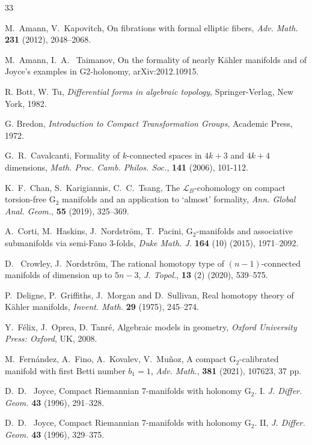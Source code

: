 \documentclass[10pt]{article}
\newcommand{\Gtwo}{\mathrm{G}_2}
\theoremstyle{plain}
\theoremstyle{definition}
\theoremstyle{remark}
\begin{document}
\begin{thebibliography}{33}

M.~Amann, V.~Kapovitch, On fibrations with formal elliptic fibers, \textit{Adv. Math.} \textbf{231} (2012), 2048--2068.

M.~Amann, I.~A.~ Taimanov, On the formality of nearly Kähler manifolds and of Joyce's examples in G2-holonomy,  	arXiv:2012.10915.
 
 R. Bott, W. Tu, {\em Differential forms in algebraic topology}, Springer-Verlag, New York, 1982.

G. Bredon, {\it Introduction to Compact Transformation Groups}, Academic Press, 1972.

G.~R.~Cavalcanti, Formality of $k$-connected spaces in $4k+ 3$ and $4k+ 4$ dimensions, {\em Math. Proc. Camb. Philos. Soc.}, {\bf 141} (2006), 101-112.

K.~F.~Chan, S.~Karigiannis, C.~C.~Tsang, The $\mathcal{L}_B$-cohomology on compact torsion-free $\Gtwo$ manifolds and an application to ‘almost’ formality,{ \em Ann. Global Anal. Geom.},  {\bf 55} (2019), 325--369.
 

A.~Corti, M.~Haskins, J.~Nordstr\"om,  T.~Pacini, $\Gtwo$-manifolds and associative submanifolds via
semi-Fano 3-folds,  {\em Duke Math. J.\/} {\bf 164} (10) (2015), 1971--2092.

D.~ Crowley,  J.~Nordstr\"om,  The  rational  homotopy  type  of  $(n-1)$-connected  manifolds  of dimension up to $5n-3$, {\em J. Topol.}, {\bf 13} (2) (2020), 539--575. 

P.~Deligne, P.~Griffiths, J.~Morgan and D.~Sullivan,
 Real homotopy theory of K\"ahler manifolds,
 {\em Invent. Math.\/} {\bf 29} (1975), 245--274.
 
 Y.~F\' elix, J.~Oprea, D. Tanr\' e, Algebraic models in geometry, {\em Oxford University Press: Oxford\/}, UK, 2008.

 M.~Fern\' andez, A.~Fino, A.~Kovalev, V.~Muñoz, A compact $\Gtwo$-calibrated manifold with first Betti number $b_1=1$, {\em Adv. Math.}, {\bf 381}
(2021), 107623, 37 pp.



  
  D.~D.~ Joyce, Compact Riemannian 7-manifolds with holonomy $\Gtwo$. I.
  {\em J. Differ. Geom.\/} {\bf 43} (1996), 291--328.
  
  D.~D.~ Joyce, Compact Riemannian 7-manifolds with holonomy $\Gtwo$.  II, 
  {\em J. Differ. Geom.\/} {\bf 43} (1996), 329--375.
  

\end{thebibliography}
\end{document}
